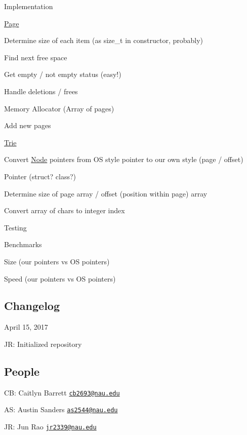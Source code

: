 \begin{DoxyItemize}
\item Implementation
\begin{DoxyItemize}
\item \hyperlink{class_page}{Page}
\begin{DoxyItemize}
\item Determine size of each item (as size\+\_\+t in constructor, probably)
\item Find next free space
\item Get empty / not empty status (easy!)
\item Handle deletions / frees
\end{DoxyItemize}
\item Memory Allocator (Array of pages)
\begin{DoxyItemize}
\item Add new pages
\end{DoxyItemize}
\item \hyperlink{class_trie}{Trie}
\begin{DoxyItemize}
\item Convert \hyperlink{class_node}{Node} pointers from OS style pointer to our own style (page / offset)
\end{DoxyItemize}
\item Pointer (struct? class?)
\begin{DoxyItemize}
\item Determine size of page array / offset (position within page) array
\item Convert array of chars to integer index
\end{DoxyItemize}
\end{DoxyItemize}
\item Testing
\begin{DoxyItemize}
\item Benchmarks
\begin{DoxyItemize}
\item Size (our pointers vs OS pointers)
\item Speed (our pointers vs OS pointers)
\end{DoxyItemize}
\end{DoxyItemize}
\end{DoxyItemize}

\subsection*{Changelog}

April 15, 2017
\begin{DoxyItemize}
\item JR\+: Initialized repository
\end{DoxyItemize}

\subsection*{People}


\begin{DoxyItemize}
\item CB\+: Caitlyn Barrett \href{mailto:cb2693@nau.edu}{\tt cb2693@nau.\+edu}
\item AS\+: Austin Sanders \href{mailto:as2544@nau.edu}{\tt as2544@nau.\+edu}
\item JR\+: Jun Rao \href{mailto:jr2339@nau.edu}{\tt jr2339@nau.\+edu} 
\end{DoxyItemize}